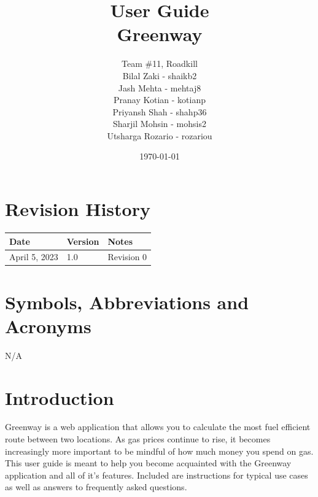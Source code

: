 \documentclass[12pt, titlepage]{article}
\begin{document}
\title{User Guide\\Greenway} 
\author{Team \#11, Roadkill
		\\ Bilal Zaki - shaikb2 
		\\ Jash Mehta - mehtaj8
		\\ Pranay Kotian - kotianp 
        \\ Priyansh Shah - shahp36
        \\ Sharjil Mohsin - mohsis2
        \\ Utsharga Rozario - rozariou
}
\date{\today}

\maketitle


\tableofcontents

\newpage

\section{Revision History}

\begin{tabularx}{\textwidth}{p{3cm}p{2cm}X}
\toprule {\bf Date} & {\bf Version} & {\bf Notes}\\
\midrule
April 5, 2023 & 1.0 & Revision 0\\
\bottomrule
\end{tabularx}

\section{Symbols, Abbreviations and Acronyms}

N/A

\newpage


\section{Introduction}
Greenway is a web application that allows you to calculate the most fuel efficient route between two locations. As gas prices continue to rise, it becomes increasingly more important to be mindful of how much money you spend on gas. This user guide is meant to help you become acquainted with the Greenway application and all of it's features. Included are instructions for typical use cases as well as answers to frequently asked questions. 
\end{document}
